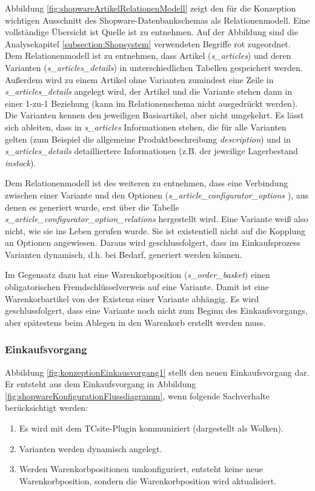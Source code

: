 \documentclass[12pt,a4paper,bibliography=totocnumbered,listof=totoc]{scrartcl}
\begin{document}
Abbildung \ref{fig:shopwareArtikelRelationenModell} zeigt den für die Konzeption wichtigen Ausschnitt des Shopware-Datenbankschemas als Relationenmodell. Eine vollständige Übersicht ist Quelle ist \citet{shopwareDatabaseScheme} zu entnehmen. Auf der Abbildung sind die Analysekapitel \ref{subsection:Shopsystem} verwendeten Begriffe rot zugeordnet. Dem Relationenmodell ist zu entnehmen, dass Artikel (\emph{s\_articles}) und deren Varianten (\emph{s\_articles\_details}) in unterschiedlichen Tabellen gespeichert werden. Außerdem wird zu einem Artikel ohne Varianten zumindest eine Zeile in \emph{s\_articles\_details} angelegt wird, der Artikel und die Variante stehen dann in einer 1-zu-1 Beziehung (kann im Relationenschema nicht ausgedrückt werden). Die Varianten kennen den jeweiligen Basisartikel, aber nicht umgekehrt. Es lässt sich ableiten, dass in \emph{s\_articles} Informationen stehen, die für alle Varianten gelten (zum Beispiel die allgemeine Produktbeschreibung \emph{description}) und in \emph{s\_articles\_details} detailliertere Informationen (z.B. der jeweilige Lagerbestand \emph{instock}).

Dem Relationenmodell ist des weiteren zu entnehmen, dass eine Verbindung zwischen einer Variante und den Optionen (\emph{s\_article\_configurator\_options }), aus denen es generiert wurde, erst über die Tabelle \emph{s\_article\_configurator\_option\_relations} hergestellt wird. Eine Variante weiß also nicht, wie sie ins Leben gerufen wurde. Sie ist existentiell nicht auf die Kopplung an Optionen angewiesen. Daraus wird geschlussfolgert, dass im Einkaufsprozess Varianten dynamisch, d.h. bei Bedarf, generiert werden können.

Im Gegensatz dazu hat eine Warenkorbposition (\emph{s\_order\_basket}) einen obligatorischen Fremdschlüsselverweis auf eine Variante. Damit ist eine Warenkorbartikel von der Existenz einer Variante abhängig. Es wird geschlussfolgert, dass eine Variante noch nicht zum Beginn des Einkaufsvorgangs, aber spätestens beim Ablegen in den Warenkorb erstellt werden muss.

\subsubsection{Einkaufsvorgang}
Abbildung \ref{fig:konzeptionEinkausvorgang1} stellt den neuen Einkaufsvorgang dar. Er entsteht aus dem Einkaufsvorgang in Abbildung \ref{fig:shopwareKonfigurationFlussdiagramm}, wenn folgende Sachverhalte berücksichtigt werden:
\begin{enumerate}
\item Es wird mit dem TCsite-Plugin kommuniziert (dargestellt als Wolken).
\item Varianten werden dynamisch angelegt.
\item Werden Warenkorbpositionen umkonfiguriert, entsteht keine neue Warenkorbposition, sondern die Warenkorbposition wird aktualisiert.
\end{enumerate}
\end{document}
